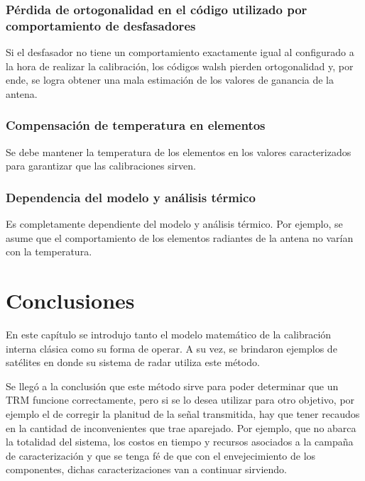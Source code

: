 \subsubsection{Pérdida de ortogonalidad en el código utilizado por comportamiento de desfasadores}

Si el desfasador no tiene un comportamiento exactamente igual al configurado a la hora de realizar la calibración, los códigos
walsh pierden ortogonalidad y, por ende, se logra obtener una mala estimación de los valores de ganancia de la antena.


\subsubsection{Compensación de temperatura en elementos}

Se debe mantener la temperatura de los elementos en los valores caracterizados para garantizar que las calibraciones sirven.


\subsubsection{Dependencia del modelo y análisis térmico}

Es completamente dependiente del modelo y análisis térmico. Por ejemplo, se asume que el comportamiento de los elementos
radiantes de la antena no varían con la temperatura.

\section{Conclusiones}

En este capítulo se introdujo tanto el modelo matemático de la calibración interna clásica como su forma de operar. A su vez,
se brindaron ejemplos de satélites en donde su sistema de radar utiliza este método.

Se llegó a la conclusión que este método sirve para poder determinar que un TRM funcione correctamente, pero si se lo desea
utilizar para otro objetivo, por ejemplo el de corregir la planitud de la señal transmitida, hay que tener recaudos en la
cantidad de inconvenientes que trae aparejado. Por ejemplo, que no abarca la totalidad del sistema, los costos en tiempo y
recursos asociados a la campaña de caracterización y que se tenga fé de que con el envejecimiento de los componentes, dichas
caracterizaciones van a continuar sirviendo.

